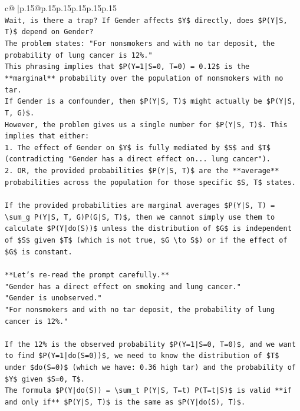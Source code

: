 \documentclass{article}
\begin{document}
{\begin{supertabular}{c@{$\;$}|p{.15\linewidth}@{}p{.15\linewidth}p{.15\linewidth}p{.15\linewidth}p{.15\linewidth}p{.15\linewidth}}
{{{\\ 
\texttt{Wait, is there a trap? If Gender affects \$Y\$ directly, does \$P(Y|S, T)\$ depend on Gender?} \\
\texttt{The problem states: "For nonsmokers and with no tar deposit, the probability of lung cancer is 12\%."} \\
\texttt{This phrasing implies that \$P(Y=1|S=0, T=0) = 0.12\$ is the **marginal** probability over the population of nonsmokers with no tar.} \\
\texttt{If Gender is a confounder, then \$P(Y|S, T)\$ might actually be \$P(Y|S, T, G)\$.} \\
\texttt{However, the problem gives us a single number for \$P(Y|S, T)\$. This implies that either:} \\
\texttt{1.  The effect of Gender on \$Y\$ is fully mediated by \$S\$ and \$T\$ (contradicting "Gender has a direct effect on... lung cancer").} \\
\texttt{2.  OR, the provided probabilities \$P(Y|S, T)\$ are the **average** probabilities across the population for those specific \$S, T\$ states.} \\
\\ 
\texttt{If the provided probabilities are marginal averages \$P(Y|S, T) = \textbackslash{}sum\_g P(Y|S, T, G)P(G|S, T)\$, then we cannot simply use them to calculate \$P(Y|do(S))\$ unless the distribution of \$G\$ is independent of \$S\$ given \$T\$ (which is not true, \$G \textbackslash{}to S\$) or if the effect of \$G\$ is constant.} \\
\\ 
\texttt{**Let's re{-}read the prompt carefully.**} \\
\texttt{"Gender has a direct effect on smoking and lung cancer."} \\
\texttt{"Gender is unobserved."} \\
\texttt{"For nonsmokers and with no tar deposit, the probability of lung cancer is 12\%."} \\
\\ 
\texttt{If the 12\% is the observed probability \$P(Y=1|S=0, T=0)\$, and we want to find \$P(Y=1|do(S=0))\$, we need to know the distribution of \$T\$ under \$do(S=0)\$ (which we have: 0.36 high tar) and the probability of \$Y\$ given \$S=0, T\$.} \\
\texttt{The formula \$P(Y|do(S)) = \textbackslash{}sum\_t P(Y|S, T=t) P(T=t|S)\$ is valid **if and only if** \$P(Y|S, T)\$ is the same as \$P(Y|do(S), T)\$.} \\
}}}
\end{supertabular}}
\end{document}
